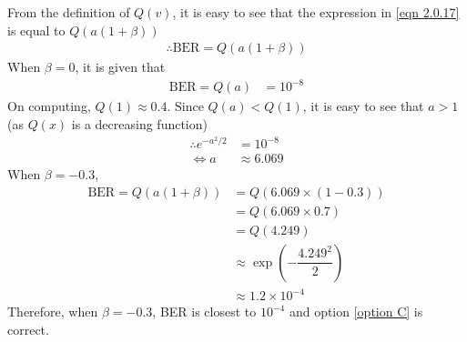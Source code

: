 \documentclass[journal,10pt,twocolumn]{IEEEtran}
\begin{document}
From the definition of $Q(v)$, it is easy to see that the expression in \ref{eqn 2.0.17} is equal to $Q(a(1+\beta))$
\begin{align}
\therefore \text{BER} = Q(a(1+\beta ))
\end{align}
When $\beta = 0$, it is given that 
\begin{align}
\text{BER} = Q(a) &= 10^{-8}
\end{align}
On computing, $Q(1) \approx 0.4$. Since $Q(a)<Q(1)$, it is easy to see that $a>1$ (as $Q(x)$ is a decreasing function)
\begin{align}
\therefore e^{-a^2 / 2} &= 10^{-8}\\
\Leftrightarrow a &\approx 6.069
\end{align}
When $\beta = -0.3$,
\begin{align}
\text{BER} = Q(a(1+\beta)) &= Q(6.069 \times (1-0.3))\\
&= Q(6.069 \times 0.7)\\
&= Q(4.249)\\
&\approx \exp (-\dfrac{4.249^2}{2})\\
&\approx 1.2 \times 10^{-4}
\end{align}
Therefore, when $\beta = -0.3$, BER is closest to $10^{-4}$ and option \ref{option C} is correct.
\end{document}
